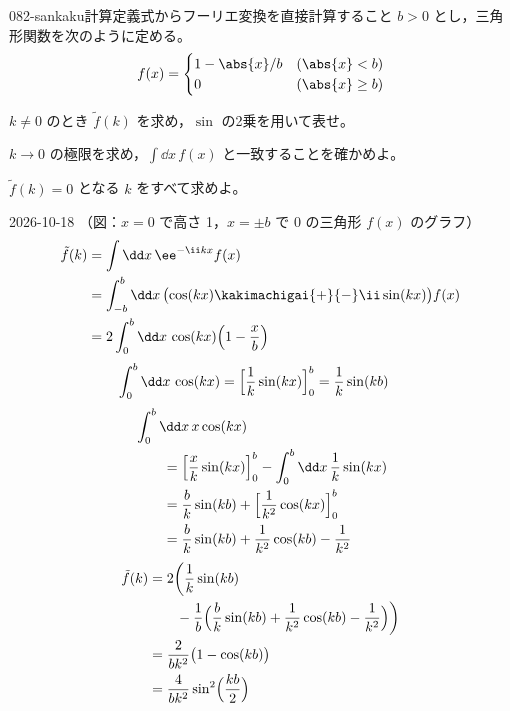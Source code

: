 \documentclass[uplatex,dvipdfmx,a4paper,11pt]{jsarticle}
\begin{document}
\begin{mondai}{082-sankaku}{計算}{定義式からフーリエ変換を直接計算すること}
$b>0$ とし，三角形関数を次のように定める。
  \[ f(x)=\begin{cases}1-\abs{x}/b & (\abs{x}<b)\\ 0 & (\abs{x}\ge b)\end{cases} \]
  \begin{shoumon}
    \item $k\neq0$ のとき $\tilde f(k)$ を求め，$\sin$ の2乗を用いて表せ。
    \item $k\to0$ の極限を求め，$\int\dd x\,f(x)$ と一致することを確かめよ。
    \item $\tilde f(k)=0$ となる $k$ をすべて求めよ。
  \end{shoumon}
\begin{kotaeutsushi}{2026-10-18}
（図：$x=0$ で高さ 1，$x=\pm b$ で 0 の三角形 $f(x)$ のグラフ）
\begin{align*}
  \tilde f(k)&=\int\dd x\,\ee^{-\ii kx}f(x)\\
  &=\int_{-b}^{b}\dd x\,\bigl(\cos(kx)\kakimachigai{+}{-}\ii\sin(kx)\bigr)f(x)\\
  &=2\int_{0}^{b}\dd x\,\cos(kx)\Bigl(1-\frac{x}{b}\Bigr)
\end{align*}
\begin{align*}
  \int_{0}^{b}\dd x\,\cos(kx)&=\Bigl[\frac{1}{k}\sin(kx)\Bigr]_{0}^{b}=\frac{1}{k}\sin(kb)
\end{align*}
\begin{align*}
  &\int_{0}^{b}\dd x\,x\cos(kx)\\
  &\qquad=\Bigl[\frac{x}{k}\sin(kx)\Bigr]_{0}^{b}-\int_{0}^{b}\dd x\,\frac{1}{k}\sin(kx)\\
  &\qquad=\frac{b}{k}\sin(kb)+\Bigl[\frac{1}{k^{2}}\cos(kx)\Bigr]_{0}^{b}\\
  &\qquad=\frac{b}{k}\sin(kb)+\frac{1}{k^{2}}\cos(kb)-\frac{1}{k^{2}}
\end{align*}
\begin{align*}
  \tilde f(k)&=2\biggl(\frac{1}{k}\sin(kb)\\
  &\qquad-\frac{1}{b}\Bigl(\frac{b}{k}\sin(kb)+\frac{1}{k^{2}}\cos(kb)-\frac{1}{k^{2}}\Bigr)\biggr)\\
  &=\frac{2}{bk^{2}}\bigl(1-\cos(kb)\bigr)\\
  &=\frac{4}{bk^{2}}\sin^{2}\Bigl(\frac{kb}{2}\Bigr)
\end{align*}

\end{kotaeutsushi}
\end{mondai}
\end{document}
